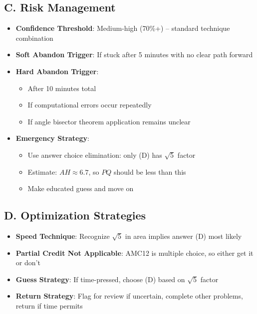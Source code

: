 \documentclass[12pt]{article}
\begin{document}
\begin{competitionbox}
\subsection*{C. Risk Management}
\begin{itemize}[leftmargin=*]
    \item \textbf{Confidence Threshold}: Medium-high (70\%+) -- standard technique combination
    \item \textbf{Soft Abandon Trigger}: If stuck after 5 minutes with no clear path forward
    \item \textbf{Hard Abandon Trigger}: 
    \begin{itemize}
        \item After 10 minutes total
        \item If computational errors occur repeatedly
        \item If angle bisector theorem application remains unclear
    \end{itemize}
    \item \textbf{Emergency Strategy}: 
    \begin{itemize}
        \item Use answer choice elimination: only (D) has $\sqrt{5}$ factor
        \item Estimate: $AH \approx 6.7$, so $PQ$ should be less than this
        \item Make educated guess and move on
    \end{itemize}
\end{itemize}

\subsection*{D. Optimization Strategies}
\begin{itemize}[leftmargin=*]
    \item \textbf{Speed Technique}: Recognize $\sqrt{5}$ in area implies answer (D) most likely
    \item \textbf{Partial Credit Not Applicable}: AMC12 is multiple choice, so either get it or don't
    \item \textbf{Guess Strategy}: If time-pressed, choose (D) based on $\sqrt{5}$ factor
    \item \textbf{Return Strategy}: Flag for review if uncertain, complete other problems, return if time permits
\end{itemize}
\end{competitionbox}
\end{document}
